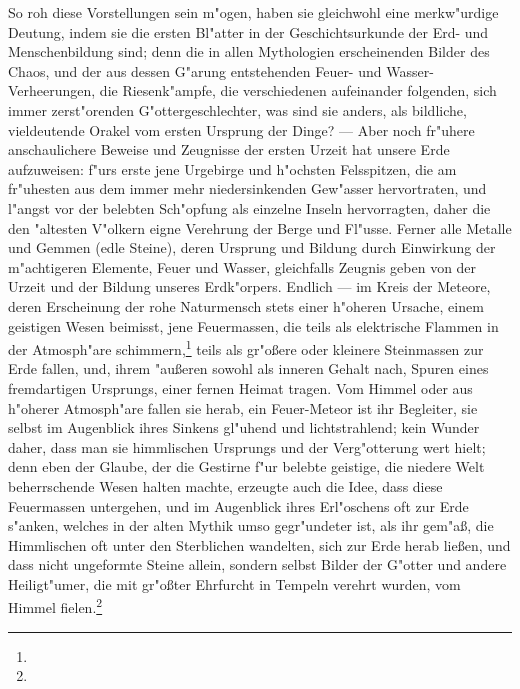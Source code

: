 \documentclass[a4paper, 11pt, oneside, polutonikogreek, german]{article}
\begin{document}
So roh diese Vorstellungen sein m"ogen, haben sie gleichwohl eine merkw"urdige Deutung, indem sie die ersten Bl"atter in der Geschichtsurkunde der Erd- und Menschenbildung sind; denn die in allen Mythologien erscheinenden Bilder des Chaos, und der aus dessen G"arung entstehenden Feuer- und Wasser-Verheerungen, die Riesenk"ampfe, die verschiedenen aufeinander folgenden, sich immer zerst"orenden G"ottergeschlechter, was sind sie anders, als bildliche, vieldeutende Orakel vom ersten Ursprung der Dinge? --- Aber noch fr"uhere anschaulichere Beweise und Zeugnisse der ersten Urzeit hat unsere Erde aufzuweisen: f"urs erste jene Urgebirge und h"ochsten Felsspitzen, die am fr"uhesten aus dem immer mehr niedersinkenden Gew"asser hervortraten, und l"angst vor der belebten Sch"opfung als einzelne Inseln hervorragten, daher die den "altesten V"olkern eigne Verehrung der Berge und Fl"usse. Ferner alle Metalle und Gemmen (edle Steine), deren Ursprung und Bildung durch Einwirkung der m"achtigeren Elemente, Feuer und Wasser, gleichfalls Zeugnis geben von der Urzeit und der Bildung unseres Erdk"orpers. Endlich --- im Kreis der Meteore, deren Erscheinung der rohe Naturmensch stets einer h"oheren Ursache, einem geistigen Wesen beimisst, jene Feuermassen, die teils als elektrische Flammen in der Atmosph"are schimmern,\footnote{} teils als gr"oßere oder kleinere Steinmassen zur Erde fallen, und, ihrem "außeren sowohl als inneren Gehalt nach, Spuren eines fremdartigen Ursprungs, einer fernen Heimat tragen. Vom Himmel oder aus h"oherer Atmosph"are fallen sie herab, ein Feuer-Meteor ist ihr Begleiter, sie selbst im Augenblick ihres Sinkens gl"uhend und lichtstrahlend; kein Wunder daher, dass man sie himmlischen Ursprungs und der Verg"otterung wert hielt; denn eben der Glaube, der die Gestirne f"ur belebte geistige, die niedere Welt beherrschende Wesen halten machte, erzeugte auch die Idee, dass diese Feuermassen untergehen, und im Augenblick ihres Erl"oschens oft zur Erde s"anken, welches in der alten Mythik umso gegr"undeter ist, als ihr gem"aß, die Himmlischen oft unter den Sterblichen wandelten, sich zur Erde herab ließen, und dass nicht ungeformte Steine allein, sondern selbst Bilder der G"otter und andere Heiligt"umer, die mit gr"oßter Ehrfurcht in Tempeln verehrt wurden, vom Himmel fielen.\footnote{}
\end{document}
